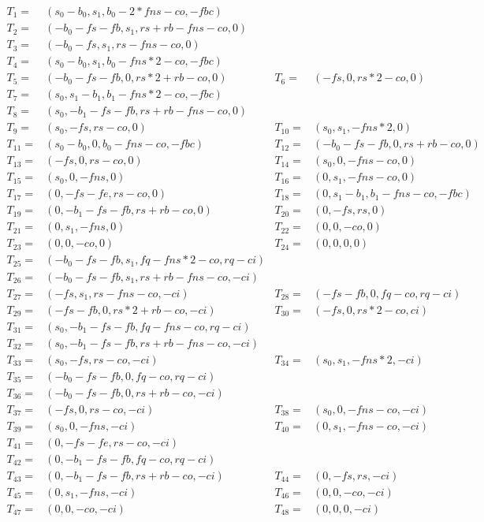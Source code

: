 \begin{align*}
	T_1 = & (s_0-b_0, s_1, b_0- 2 * fns - co,-fbc) \\
	T_2 = &(-b_0-fs-fb, s_1, rs + rb-fns - co, 0) \\
	T_3 = &(-b_0-fs, s_1, rs-fns - co, 0) \\
	T_4 = &(s_0-b_0, s_1, b_0 - fns * 2 - co, -fbc) \\
	T_5 = &(-b_0-fs - fb, 0, rs * 2 + rb - co, 0) &
	T_6 = &(-fs, 0, rs * 2 - co, 0) \\
	T_7 = &(s_0, s_1-b_1, b_1-fns * 2 - co, -fbc) \\
	T_8 = &(s_0, -b_1 -fs -fb, rs + rb - fns - co, 0) \\
	T_9 = &(s_0, -fs, rs - co, 0) &
	T_{10} =& (s_0, s_1, -fns * 2, 0) \\
	T_{11} = &(s_0-b_0, 0, b_0-fns - co, -fbc) &
	T_{12} = &(-b_0-fs-fb, 0, rs + rb - co, 0) \\
	T_{13} = &(-fs, 0, rs - co, 0) &
	T_{14} = &(s_0, 0, -fns - co, 0) \\
	T_{15} = &(s_0, 0, -fns, 0) &
	T_{16} = &(0, s_1, -fns - co, 0) \\
	T_{17} = &(0, -fs-fe, rs-co, 0) &
	T_{18} = &(0, s_1-b_1, b_1-fns-co, -fbc) \\
	T_{19} = &(0,-b_1 -fs-fb, rs + rb - co, 0) &
	T_{20} = &(0, -fs, rs, 0) \\
	T_{21} = &(0, s_1, -fns, 0) &
	T_{22} = &(0, 0, -co, 0) \\
	T_{23} = &(0, 0, -co, 0) &
	T_{24} = &(0, 0, 0, 0) \\
	T_{25} = &(-b_0-fs -fb, s_1, fq-fns * 2-co, rq -ci) \\
	T_{26} = &(-b_0-fs-fb, s_1, rs + rb-fns - co, -ci) \\
	T_{27} = &(-fs, s_1, rs-fns-co, -ci) &
	T_{28} = &(-fs-fb, 0, fq-co, rq-ci) \\
	T_{29} = &(-fs-fb, 0, rs * 2 + rb-co, -ci) &
	T_{30} = &(-fs, 0, rs * 2-co, ci) \\
	T_{31} = &(s_0, -b_1 -fs-fb, fq-fns-co, rq-ci) \\
	T_{32} = &(s_0, -b_1 -fs-fb, rs + rb-fns - co, -ci) \\
	T_{33} = &(s_0, -fs, rs - co, -ci) &
	T_{34} = &(s_0, s_1, -fns * 2, -ci) \\
	T_{35} = &(-b_0-fs-fb, 0, fq-co, rq -ci) \\
	T_{36} = &(-b_0-fs-fb, 0, rs + rb - co, -ci) \\
	T_{37} = &(-fs, 0, rs - co, -ci) &
	T_{38} = &(s_0, 0, -fns - co, -ci) \\
	T_{39} = &(s_0, 0, -fns, -ci) &
	T_{40} = &(0, s_1, -fns - co, -ci) \\
	T_{41} = &(0, -fs-fe, rs-co, -ci) \\
	T_{42} = &(0, -b_1 -fs-fb, fq - co, rq -ci) \\
	T_{43} = &(0, -b_1 -fs-fb, rs + rb - co, -ci) &
	T_{44} = &(0, -fs, rs, -ci) \\
	T_{45} = &(0, s_1, -fns, -ci) &
	T_{46} = &(0, 0, -co, -ci) \\
	T_{47} = &(0, 0, -co, -ci) &
	T_{48} = &(0, 0, 0, -ci)	
\end{align*}
